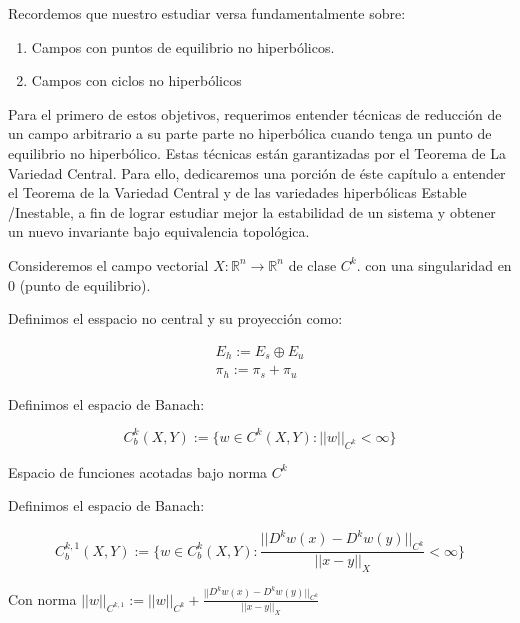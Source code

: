 \begin{rmrk}
	Recordemos que nuestro estudiar versa fundamentalmente sobre:
	
	\begin{enumerate}
		\item Campos con puntos de equilibrio no hiperbólicos.
		
		\item Campos con ciclos no hiperbólicos
	\end{enumerate}	
	
	Para el primero de estos objetivos, requerimos entender técnicas de reducción de un campo arbitrario a su parte parte no hiperbólica cuando tenga un punto de equilibrio no hiperbólico. Estas técnicas están garantizadas por el Teorema de La Variedad Central. Para ello, dedicaremos una porción de éste capítulo a entender el Teorema de la Variedad Central y de las variedades hiperbólicas Estable /Inestable, a fin de lograr estudiar mejor la estabilidad de un sistema y obtener un nuevo invariante bajo equivalencia topológica.
\end{rmrk}

\begin{defn}
	Consideremos el campo vectorial $X:\mathbb{R}^n \to \mathbb{R}^n$ de clase $C^k$. con una singularidad en $0$ (punto de equilibrio).
	
	Definimos el esspacio no central y su proyección como:
	
	\begin{align*}
		E_h := E_s \oplus E_u \\
		\pi_h := \pi_s + \pi_u	
	\end{align*}
\end{defn}


\begin{defn}
	Definimos el espacio de Banach:
	
	\begin{equation*}
		C_b^k(X,Y) := \{ w \in C^k(X,Y): ||w||_{C^k}<\infty\}
	\end{equation*}
	
	Espacio de funciones acotadas bajo norma $C^k$
\end{defn}

\begin{defn}
	Definimos el espacio de Banach:
	
	\begin{equation*}
		C_b^{k,1}(X,Y) := \{ w \in C_b^k(X,Y): \frac{||D^kw(x)-D^kw(y)||_{C^k}}{||x-y||_X}<\infty\}
	\end{equation*}
	
	Con norma $||w||_{C^{k,1}} := ||w||_{C^k} + \frac{||D^kw(x)-D^kw(y)||_{C^k}}{||x-y||_X}$
\end{defn}



